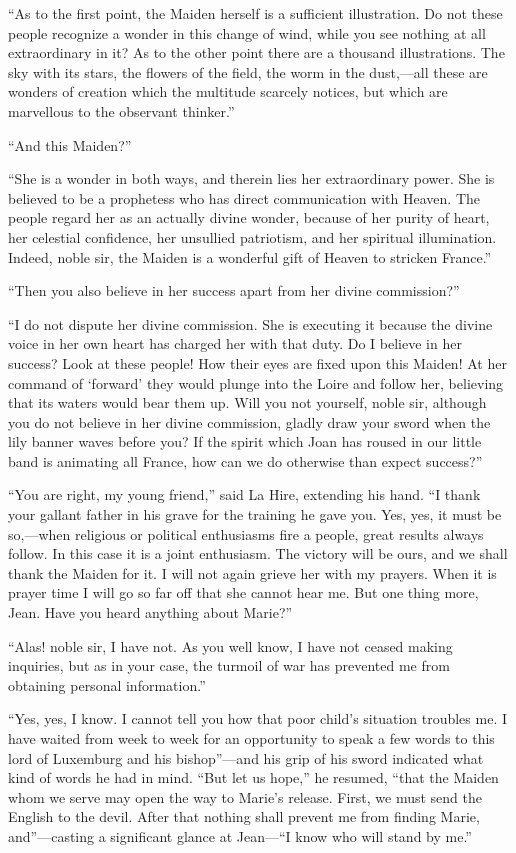 ``As to the first point, the Maiden herself is a sufficient
illustration. Do not these people recognize a wonder in this change of
wind, while you see nothing at all extraordinary in it? As to the other
point there are a thousand illustrations. The sky with its stars, the
flowers of the field, the worm in the dust,---all these are wonders of
creation which the multitude scarcely notices, but which are marvellous
to the observant thinker.''

``And this Maiden?''

``She is a wonder in both ways, and therein lies her extraordinary
power. She is believed to be a prophetess who has direct communication
with Heaven. The people regard her as an actually divine wonder, because
of her purity of heart, her celestial confidence, her unsullied
patriotism, and her spiritual illumination. Indeed, noble sir, the
Maiden is a wonderful gift of Heaven to stricken France.''

``Then you also believe in her success apart from her divine
commission?''

``I do not dispute her divine commission. She is executing it because
the divine voice in her own heart has charged her with that duty. Do I
believe in her success? Look at these people! How their eyes are fixed
upon this Maiden! At her command of `forward' they would plunge into the
Loire and follow her, believing that its waters would bear them up. Will
you not yourself, noble sir, although you do not believe in her divine
commission, gladly draw your sword when the lily banner waves before
you? If the spirit which Joan has roused in our little band is animating
all France, how can we do otherwise than expect success?''

``You are right, my young friend,'' said La Hire, extending his hand.
``I thank your gallant father in his grave for the training he gave you.
Yes, yes, it must be so,---when religious or political enthusiasms fire
a people, great results always follow. In this case it is a joint
enthusiasm. The victory will be ours, and we shall thank the Maiden for
it. I will not again grieve her with my prayers. When it is prayer time
I will go so far off that she cannot hear me. But one thing more, Jean.
Have you heard anything about Marie?''

``Alas! noble sir, I have not. As you well know, I have not ceased
making inquiries, but as in your case, the turmoil of war has prevented
me from obtaining personal information.''

``Yes, yes, I know. I cannot tell you how that poor child's situation
troubles me. I have waited from week to week for an opportunity to speak
a few words to this lord of Luxemburg and his bishop''---and his grip of
his sword indicated what kind of words he had in mind. ``But let us
hope,'' he resumed, ``that the Maiden whom we serve may open the way to
Marie's release. First, we must send the English to the devil. After
that nothing shall prevent me from finding Marie, and''---casting a
significant glance at Jean---``I know who will stand by me.''

